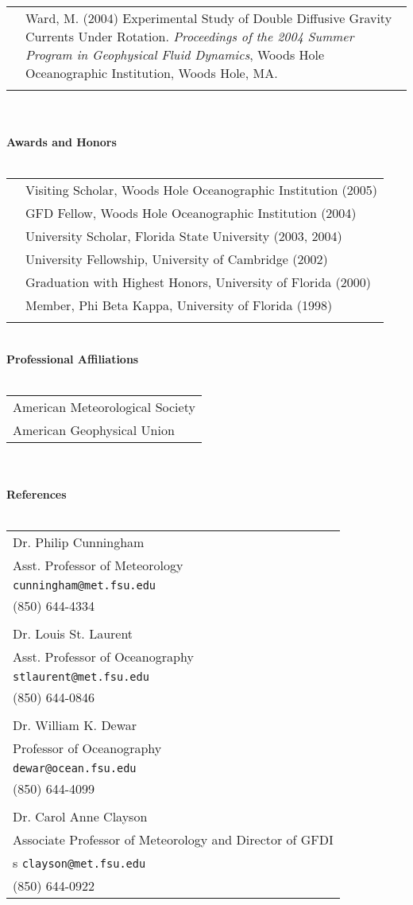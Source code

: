 \documentclass[10pt, letterpaper]{article}
\begin{document}
\\
\begin{tabular}{lp{6.15in}}
& Ward, M. (2004) Experimental Study of Double Diffusive Gravity Currents Under Rotation. \emph{Proceedings of the 2004 Summer Program in Geophysical Fluid Dynamics}, Woods Hole Oceanographic Institution, Woods Hole, MA. \\
\\
\end{tabular}
\\
\\
\textbf{Awards and Honors} \\
\\
\begin{tabular}{lp{6.15in}}
&Visiting Scholar, Woods Hole Oceanographic Institution (2005) \\
&GFD Fellow, Woods Hole Oceanographic Institution (2004) \\
&University Scholar, Florida State University (2003, 2004) \\
&University Fellowship, University of Cambridge (2002) \\
&Graduation with Highest Honors, University of Florida (2000) \\
&Member, Phi Beta Kappa, University of Florida (1998) \\
\\
\end{tabular}
\\
\textbf{Professional Affiliations} \\
\\
\begin{tabular}{l}
American Meteorological Society\\
American Geophysical Union \\
\end{tabular}
\\
\\
\textbf{References} \\
\\
\begin{tabular}{l}
Dr. Philip Cunningham \\
Asst. Professor of Meteorology \\
\verb|cunningham@met.fsu.edu| \\
(850) 644-4334 \\
\\
Dr. Louis St. Laurent \\
Asst. Professor of Oceanography \\
\verb|stlaurent@met.fsu.edu| \\
(850) 644-0846 \\
\\
Dr. William K. Dewar \\
Professor of Oceanography \\
\verb|dewar@ocean.fsu.edu| \\
(850) 644-4099 \\
\\
Dr. Carol Anne Clayson \\
Associate Professor of Meteorology and Director of GFDI \\s
\verb|clayson@met.fsu.edu| \\
(850) 644-0922 \\
\end{tabular}
\end{document}
